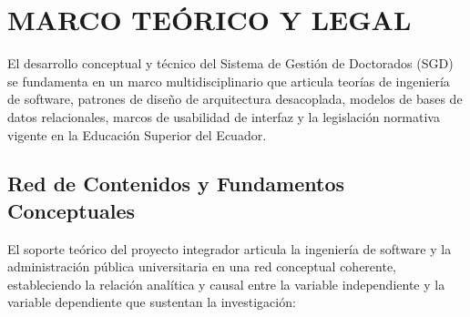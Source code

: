 
\section{MARCO TEÓRICO Y LEGAL}

El desarrollo conceptual y técnico del Sistema de Gestión de Doctorados (SGD) se fundamenta en un marco multidisciplinario que articula teorías de ingeniería de software, patrones de diseño de arquitectura desacoplada, modelos de bases de datos relacionales, marcos de usabilidad de interfaz y la legislación normativa vigente en la Educación Superior del Ecuador.

\subsection{Red de Contenidos y Fundamentos Conceptuales}

El soporte teórico del proyecto integrador articula la ingeniería de software y la administración pública universitaria en una red conceptual coherente, estableciendo la relación analítica y causal entre la variable independiente y la variable dependiente que sustentan la investigación:

